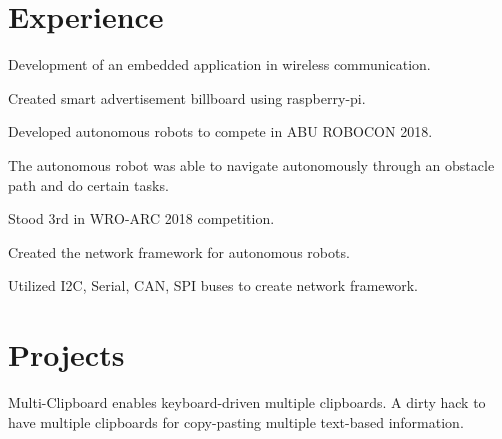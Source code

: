 \documentclass[]{deedy-resume-openfont}
\begin{document}
\begin{minipage}[t][18cm]{0.66\textwidth} 



\section{Experience}
\vspace{\topsep}
\begin{tightemize}
\item Development of an embedded application in wireless communication.
\item Created smart advertisement billboard using raspberry-pi.
\end{tightemize}
\sectionsep

\begin{tightemize}
\item Developed autonomous robots to compete in ABU ROBOCON 2018.
\item The autonomous robot was able to navigate autonomously through an obstacle path and do certain tasks.
\end{tightemize}
\sectionsep

\begin{tightemize}
\item Stood 3rd in WRO-ARC 2018 competition.
\item Created the network framework for autonomous robots.
\item Utilized I2C, Serial, CAN, SPI buses to create network framework.  
\end{tightemize}
\sectionsep





\section{Projects}
Multi-Clipboard enables keyboard-driven multiple clipboards. A dirty hack to have multiple clipboards for copy-pasting multiple text-based information.
\sectionsep


\end{minipage}
\end{document}
